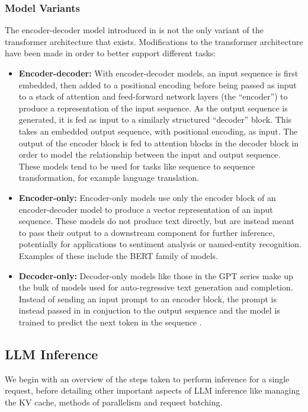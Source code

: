 \documentclass[12pt,twoside]{report}
\begin{document}
\subsubsection{Model Variants}
The encoder-decoder model introduced in \cite{vaswani2017attention} is not the only variant of the transformer architecture that exists.
Modifications to the transformer architecture have been made in order to better support different tasks:  
\begin{itemize}
  \item \textbf{Encoder-decoder:}
    With encoder-decoder models, an input sequence is first embedded, then added to a positional encoding before being passed as input to a stack of attention and feed-forward network layers (the ``encoder'') to produce a representation of the input sequence. 
    As the output sequence is generated, it is fed as input to a similarly structured ``decoder'' block. 
    This takes an embedded output sequence, with positional encoding, as input.
    The output of the encoder block is fed to attention blocks in the decoder block in order to model the relationship between the input and output sequence.
    These models \cite{raffel2020exploring} tend to be used for tasks like sequence to sequence transformation, for example language translation.
  \item \textbf{Encoder-only:}
    Encoder-only models use only the encoder block of an encoder-decoder model to produce a vector representation of an input sequence.
    These models do not produce text directly, but are instead meant to pass their output to a downstream component for further inference, potentially for applications to sentiment analysis or named-entity recognition.
    Examples of these include the BERT \cite{kenton2019bert} family of models.
  \item \textbf{Decoder-only:}
    Decoder-only models like those in the GPT \cite{radford2018improving} series make up the bulk of models used for auto-regressive text generation and completion. 
    Instead of sending an input prompt to an encoder block, the prompt is instead passed in in conjuction to the output sequence and the model is trained to predict the next token in the sequence \cite{dai2015semi}.
\end{itemize}

\subsection{LLM Inference}\label{subsection:llminference}
We begin with an overview of the steps taken to perform inference for a single request, before detailing other important aspects of LLM inference like managing the KV cache, methods of parallelism and request batching.
\end{document}
